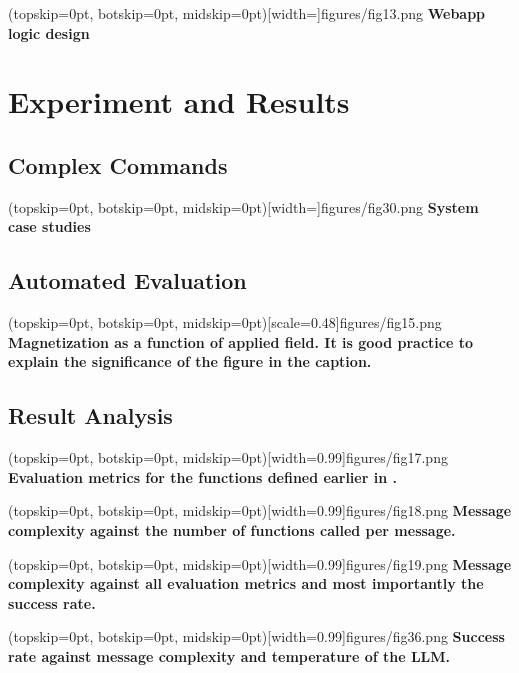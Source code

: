 \documentclass{ieeeaccess}
\begin{document}
\Figure[t!](topskip=0pt, botskip=0pt,
midskip=0pt)[width=\textwidth]{{figures/fig13.png}}
{ \textbf{Webapp logic design}\label{fig5}}

\section{Experiment and Results}
\label{sec:guidelines}

\subsection{Complex Commands}
\Figure[t!](topskip=0pt, botskip=0pt,
midskip=0pt)[width=\textwidth]{{figures/fig30.png}}
{ \textbf{System case studies}\label{fig6}}


\subsection{Automated Evaluation}
\Figure[t!](topskip=0pt, botskip=0pt, midskip=0pt)[scale=0.48]{{figures/fig15.png}}
{ \textbf{Magnetization as a function of applied field.
It is good practice to explain the significance of the figure in the caption.}\label{fig6}}
\subsection{Result Analysis}
\Figure[t!](topskip=0pt, botskip=0pt,
midskip=0pt)[width=0.99\columnwidth]{{figures/fig17.png}}
{ \textbf{Evaluation metrics for the functions defined earlier in .}\label{fig7}}

\Figure[t!](topskip=0pt, botskip=0pt,
midskip=0pt)[width=0.99\columnwidth]{{figures/fig18.png}}
{ \textbf{Message complexity against the number of functions called per message.}\label{fig8}}

\Figure[t!](topskip=0pt, botskip=0pt,
midskip=0pt)[width=0.99\columnwidth]{{figures/fig19.png}}
{ \textbf{Message complexity against all evaluation metrics and most importantly the success rate.}\label{fig9}}



\Figure[t!](topskip=0pt, botskip=0pt,
midskip=0pt)[width=0.99\columnwidth]{{figures/fig36.png}}
{ \textbf{Success rate against message complexity and temperature of the LLM.}\label{fig10}}
\end{document}
